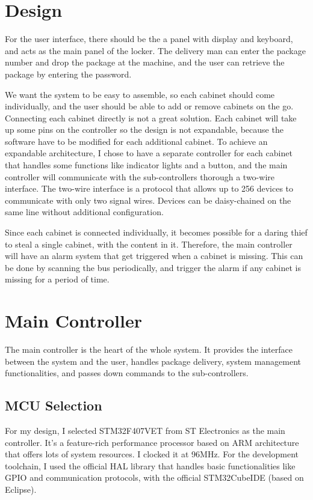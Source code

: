 \documentclass{article}
\begin{document}
\section{Design}
\par For the user interface, there should be the a panel with display and keyboard, and acts as the main panel of the locker. The delivery man can enter the package number and drop the package at the machine, and the user can retrieve the package by entering the password.

\par We want the system to be easy to assemble, so each cabinet should come individually, and the user should be able to add or remove cabinets on the go. Connecting each cabinet directly is not a great solution. Each cabinet will take up some pins on the controller so the design is not expandable, because the software have to be modified for each additional cabinet. To achieve an expandable architecture, I chose to have a separate controller for each cabinet that handles some functions like indicator lights and a button, and the main controller will communicate with the sub-controllers thorough a two-wire interface. The two-wire interface is a protocol that allows up to 256 devices to communicate with only two signal wires. Devices can be daisy-chained on the same line without additional configuration.

\par Since each cabinet is connected individually, it becomes possible for a daring thief to steal a single cabinet, with the content in it. Therefore, the main controller will have an alarm system that get triggered when a cabinet is missing. This can be done by scanning the bus periodically, and trigger the alarm if any cabinet is missing for a period of time.

\section{Main Controller}
\par The main controller is the heart of the whole system. It provides the interface between the system and the user, handles package delivery, system management functionalities, and passes down commands to the sub-controllers.

\subsection{MCU Selection}
\par For my design, I selected STM32F407VET from ST Electronics as the main controller. It's a feature-rich performance processor based on ARM architecture that offers lots of system resources. I clocked it at 96MHz. For the development toolchain, I used the official HAL library that handles basic functionalities like GPIO and communication protocols, with the official STM32CubeIDE (based on Eclipse).
\end{document}
